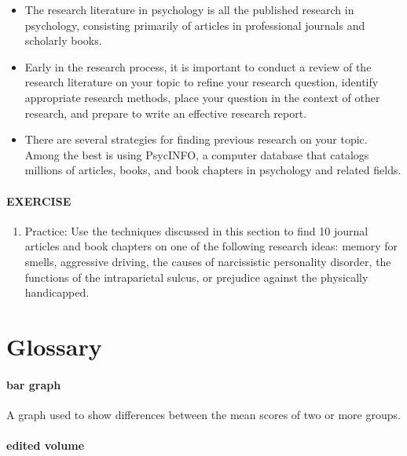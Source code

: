 \documentclass[
]{krantz}
\providecommand{\tightlist}{%
  \setlength{\itemsep}{0pt}\setlength{\parskip}{0pt}}
\begin{document}
\begin{itemize}
\tightlist
\item
  The research literature in psychology is all the published research in psychology, consisting primarily of articles in professional journals and scholarly books.
\item
  Early in the research process, it is important to conduct a review of the research literature on your topic to refine your research question, identify appropriate research methods, place your question in the context of other research, and prepare to write an effective research report.
\item
  There are several strategies for finding previous research on your topic. Among the best is using PsycINFO, a computer database that catalogs millions of articles, books, and book chapters in psychology and related fields.
\end{itemize}

\paragraph*{EXERCISE}\label{exercise-4}

\begin{enumerate}
\def\labelenumi{\arabic{enumi}.}
\tightlist
\item
  Practice: Use the techniques discussed in this section to find 10 journal articles and book chapters on one of the following research ideas: memory for smells, aggressive driving, the causes of narcissistic personality disorder, the functions of the intraparietal sulcus, or prejudice against the physically handicapped.
\end{enumerate}

\section{Glossary}\label{glossary-9}

\paragraph*{bar graph}\label{bar-graph-1}

A graph used to show differences between the mean scores of two or more groups.

\paragraph*{edited volume}\label{edited-volume}
\end{document}
